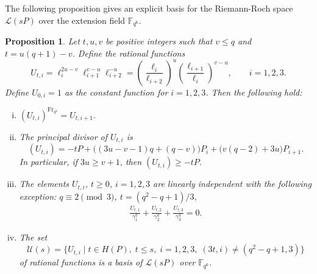 \documentclass[a4paper]{amsart}
\theoremstyle{plain}
\newtheorem{proposition}[theorem]{Proposition}
\theoremstyle{definition}
\theoremstyle{remark}
\newcommand{\Frob}{{\mathrm{Fr}_{q^2}}}
\begin{document}
The following proposition gives an explicit basis for the Riemann-Roch space $\mathscr{L}(sP)$ over the extension field $\mathbb{F}_{q^6}$.
\begin{proposition} \label{pr:Uti-props}
Let $t,u,v$ be positive integers such that $v\leq q$ and $t=u(q+1)-v$. Define the rational functions
\[U_{t,i} = \ell_i^{2u-v}\ell_{i+1}^{v-u}\ell_{i+2}^{-u} = \left(\frac{\ell_i}{\ell_{i+2}}\right)^u\left(\frac{\ell_{i+1}}{\ell_i}\right)^{v-u}, \qquad i=1,2,3.\]
Define $U_{0,i}=1$ as the constant function for $i=1,2,3$. Then the following hold:
\begin{enumerate}[(i)]
\item $(U_{t,i})^\Frob = U_{t,i+1}$. 
\item The principal divisor of $U_{t,i}$ is 
\[(U_{t,i}) = -tP + \big((3u-v-1)q+(q-v)\big) P_i + \big(v(q-2)+3u\big) P_{i+1}.\]
In particular, if $3u\geq v+1$, then $(U_{t,i}) \geq -tP$. 
\item The elements $U_{t,i}$, $t\geq 0$, $i=1,2,3$ are linearly independent with the following exception: $q\equiv 2 \pmod{3}$, $t=(q^2-q+1)/3$, 
\begin{align} \label{eq:U-lin-dep}
\frac{U_{t,1}}{\gamma_{1}^q} + \frac{U_{t,2}}{\gamma_{2}^q} + \frac{U_{t,3}}{\gamma_{3}^q} =0.
\end{align}
\item The set
\[\mathcal{U}(s) = \{U_{t,i} \mid t\in H(P), \; t\leq s, \; i=1,2,3, \; (3t,i) \neq (q^2-q+1,3)\}\]
of rational functions is a basis of $\mathscr{L}(sP)$ over $\mathbb{F}_{q^6}$. 
\end{enumerate}
\end{proposition}
\end{document}
